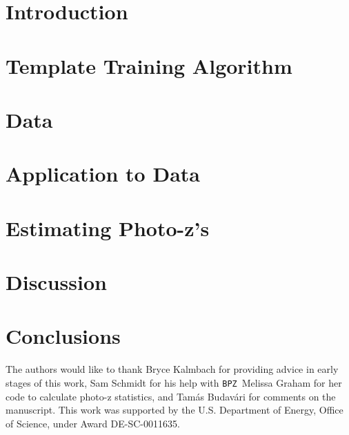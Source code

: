 \documentclass[twocolumn]{aastex63}
\newcommand{\pzcode}[1]{\texttt{#1}}
\newcommand{\bpz}{\pzcode{BPZ}}
\begin{document}



\section{Introduction}
    
    
\section{Template Training Algorithm}
    
        
\section{Data}
    

\section{Application to Data}
      
    
\section{Estimating Photo-z's}
    

\section{Discussion}
    
    
\section{Conclusions}
    

\acknowledgments

The authors would like to thank Bryce Kalmbach for providing advice in early stages of this work, Sam Schmidt for his help with \bpz\, Melissa Graham for her code to calculate photo-z statistics, and Tam\'as Budav\'ari for comments on the manuscript. This work was supported by the U.S. Department of Energy, Office of Science, under Award DE-SC-0011635.
\end{document}

